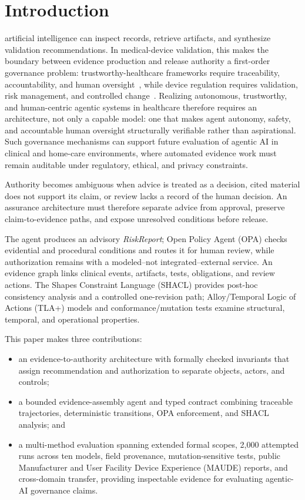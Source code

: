 \documentclass[journal,twoside,web]{ieeecolor}
\begin{document}
\section{Introduction}
\label{sec:introduction}
 artificial intelligence can inspect records, retrieve artifacts, and synthesize validation recommendations. In medical-device validation, this makes the boundary between evidence production and release authority a first-order governance problem: trustworthy-healthcare frameworks require traceability, accountability, and human oversight~\cite{future_ai,nist_ai_rmf,eu_ai_act}, while device regulation requires validation, risk management, and controlled change~\cite{fda_aiml_2021,fda_pccp_2025,eu_mdr}. Realizing autonomous, trustworthy, and human-centric agentic systems in healthcare therefore requires an architecture, not only a capable model: one that makes agent autonomy, safety, and accountable human oversight structurally verifiable rather than aspirational. Such governance mechanisms can support future evaluation of agentic AI in clinical and home-care environments, where automated evidence work must remain auditable under regulatory, ethical, and privacy constraints.

Authority becomes ambiguous when advice is treated as a decision, cited material does not support its claim, or review lacks a record of the human decision. An assurance architecture must therefore separate advice from approval, preserve claim-to-evidence paths, and expose unresolved conditions before release.

The agent produces an advisory \textit{RiskReport}; Open Policy Agent (OPA) checks evidential and procedural conditions and routes it for human review, while authorization remains with a modeled--not integrated--external service. An evidence graph links clinical events, artifacts, tests, obligations, and review actions. The Shapes Constraint Language (SHACL) provides post-hoc consistency analysis and a controlled one-revision path; Alloy/Temporal Logic of Actions (TLA+) models and conformance/mutation tests examine structural, temporal, and operational properties.

This paper makes three contributions:
\begin{itemize}
\item an evidence-to-authority architecture with formally checked invariants that assign recommendation and authorization to separate objects, actors, and controls;
\item a bounded evidence-assembly agent and typed contract combining traceable trajectories, deterministic transitions, OPA enforcement, and SHACL analysis; and
\item a multi-method evaluation spanning extended formal scopes, 2,000 attempted runs across ten models, field provenance, mutation-sensitive tests, public Manufacturer and User Facility Device Experience (MAUDE) reports, and cross-domain transfer, providing inspectable evidence for evaluating agentic-AI governance claims.
\end{itemize}
\end{document}
